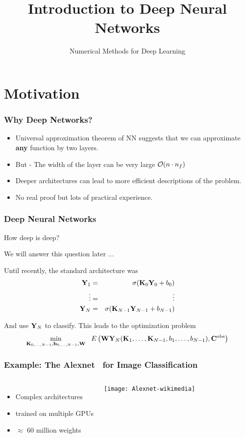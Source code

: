 \documentclass[12pt,fleqn,handout]{beamer}
\date{}
\title{Introduction to Deep Neural Networks}
\subtitle{Numerical Methods for Deep Learning}
\begin{document}
\makebeamertitle

\section{Motivation} %
\label{sec:motivation}
\begin{frame}[fragile]\frametitle{Why Deep Networks?}

\begin{itemize}
\item Universal approximation theorem of NN suggests that we can approximate {\bf any} function by
two layers.
\item But - The width of the layer can be very large ${\cal O}(n\cdot n_f)$
\item
Deeper architectures can lead to more efficient descriptions of the problem.
\item
No real proof but lots of practical experience.
\end{itemize}


\end{frame}

\begin{frame}[fragile]\frametitle{Deep Neural Networks}

How deep is deep?

We will answer this question later ...

\bigskip
\pause

Until recently, the standard architecture was
\begin{eqnarray*}
{\bf Y}_1 &=& \sigma({\bf K}_0{\bf Y}_0 + b_0) \\
\vdots & =&  \vdots \\
 {\bf Y}_N &=& \sigma({\bf K}_{N-1}  {\bf Y}_{N-1}+ b_{N-1})
 \end{eqnarray*}

\bigskip
\pause

And use ${\bf Y}_N$ to classify. This leads to the optimization problem
$$ 
\min_{{\bf K}_{0,\ldots,N-1},{\bf b}_{0,\ldots,N-1},{\bf W}} \ \ E\left({\bf W} {\bf Y}_N({\bf K}_1,\ldots,{\bf K}_{N-1},b_1,\ldots, b_{N-1}) , {\bf C}^{\rm obs} \right)
 $$

\end{frame}

\begin{frame}[fragile]\frametitle{Example: The Alexnet~\cite{KrizhevskySutskeverHinton2012} for Image Classification}

\begin{columns}
	\begin{itemize}
		\item Complex architectures 
		\item trained on multiple GPUs
		\item $\approx $ 60 million weights
	\end{itemize}	
\begin{center}
\texttt{[image: Alexnet-wikimedia]}
\end{center}
\end{columns}




\end{frame}
\end{document}
